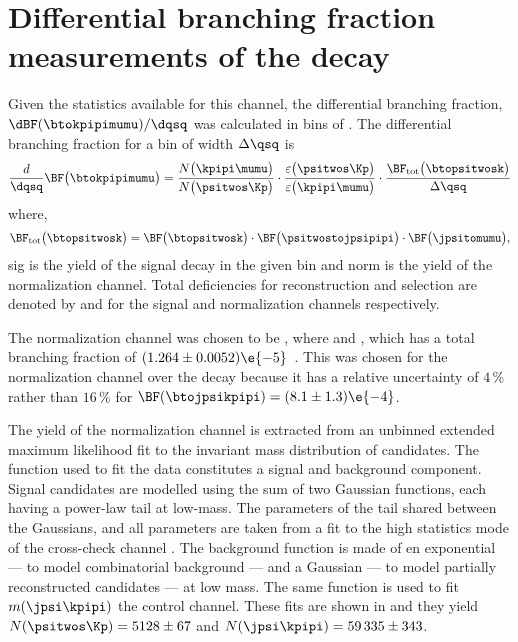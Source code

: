 \section[Differential branching fraction measurements of the decay \btokpipimumu]
{Differential branching fraction measurements of the decay \tmath{\btokpipimumu}}

Given the statistics available for this channel, the differential branching fraction,
$\dBF(\btokpipimumu)/\dqsq$ was calculated in bins of \qsq.
The differential branching fraction for a bin of width $\Delta\qsq$ is
\begin{equation}
  \frac{d}{\dqsq}\BF\big(\btokpipimumu\big)
  =
  \frac{N\big(\kpipi\mumu\big)}{N\big(\psitwos\Kp\big)} \cdot
  \frac{\varepsilon\big(\psitwos\Kp\big)}{\varepsilon\big(\kpipi\mumu\big)} \cdot
  \frac{\BF_\mathrm{tot}\big(\btopsitwosk\big)}{\Delta\qsq}
  \label{eq:kpipi:diffbf}
\end{equation}
where,
\begin{equation}
  \BF_\mathrm{tot}\big(\btopsitwosk\big)
  =
  \BF\big(\btopsitwosk\big) \cdot
  \BF\big(\psitwostojpsipipi\big) \cdot
  \BF\big(\jpsitomumu\big),
\end{equation}
\num{sig} is the yield of the signal decay \btokpipimumu in the given \qsq bin and \num{norm}
is the yield of the normalization channel.
Total deficiencies for reconstruction and selection are denoted by  and  for the
signal and normalization channels respectively.

The normalization channel was chosen to be \btopsitwosk, where \psitwostojpsipipi and \jpsitomumu,
which has a total branching fraction of $(1.264 \pm 0.0052)\e{-5}$~\cite{PDG2012}.
This was chosen for the normalization channel over the decay \btojpsikpipi because it has a
relative uncertainty of $4\,\%$ rather than $16\,\%$ for $\BF(\btojpsikpipi) = (8.1\pm1.3)\e{-4}$.

The yield  of the normalization channel is extracted from an unbinned extended maximum likelihood
fit to the invariant mass distribution of \btopsitwosk candidates.
The function used to fit the data constitutes a signal and background component.
Signal candidates are modelled using the sum of two Gaussian functions, each having a power-law
tail at low-mass.
The parameters of the tail shared between the Gaussians, and all parameters are taken from a fit to
the high statistics mode of the cross-check channel \btojpsikpipi.
The background function is made of en exponential --- to model combinatorial background --- and a
Gaussian --- to model partially reconstructed candidates --- at low mass.
The same function is used to fit $m(\jpsi\kpipi)$ the control channel.
These fits are shown in  and they yield
$N(\psitwos\Kp)=5128\pm67$ and $N(\jpsi\kpipi)=59\,335\pm343$.

